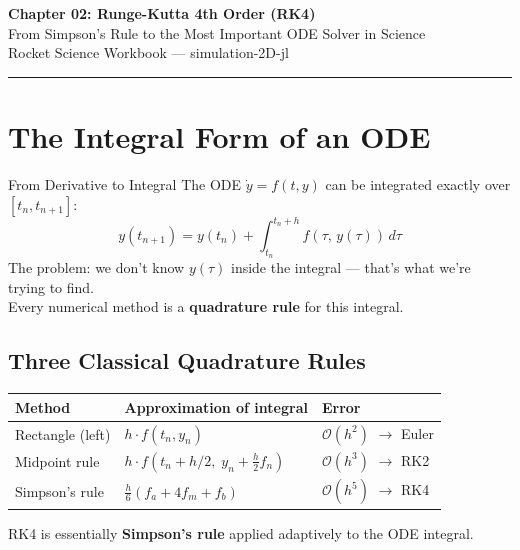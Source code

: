 \documentclass[12pt, a4paper]{article}
\begin{document}
\begin{center}
  {\LARGE \textbf{Chapter 02: Runge-Kutta 4th Order (RK4)}}\\[0.5em]
  {\large \textcolor{hintgray}{From Simpson's Rule to the Most Important ODE Solver in Science}}\\[0.3em]
  {\small \textcolor{hintgray}{Rocket Science Workbook — simulation-2D-jl}}
\end{center}
\vspace{1em}\hrule\vspace{1.5em}

\section{The Integral Form of an ODE}

\begin{theorybox}{From Derivative to Integral}
The ODE $\dot{y} = f(t,y)$ can be integrated exactly over $[t_n, t_{n+1}]$:
\[
  y(t_{n+1}) = y(t_n) + \int_{t_n}^{t_n+h} f(\tau,\, y(\tau))\,d\tau
\]
The problem: we don't know $y(\tau)$ inside the integral — that's what we're trying to find.\\[0.4em]
Every numerical method is a \textbf{quadrature rule} for this integral.
\end{theorybox}

\subsection*{Three Classical Quadrature Rules}

\begin{center}
\begin{tabular}{lll}
\textbf{Method} & \textbf{Approximation of integral} & \textbf{Error} \\
\hline
Rectangle (left) & $h\cdot f(t_n, y_n)$ & $\mathcal{O}(h^2)$ $\to$ Euler \\
Midpoint rule & $h\cdot f(t_n+h/2,\; y_n + \frac{h}{2}f_n)$ & $\mathcal{O}(h^3)$ $\to$ RK2 \\
Simpson's rule & $\frac{h}{6}(f_a + 4f_m + f_b)$ & $\mathcal{O}(h^5)$ $\to$ RK4 \\
\end{tabular}
\end{center}

RK4 is essentially \textbf{Simpson's rule} applied adaptively to the ODE integral.

\end{document}
